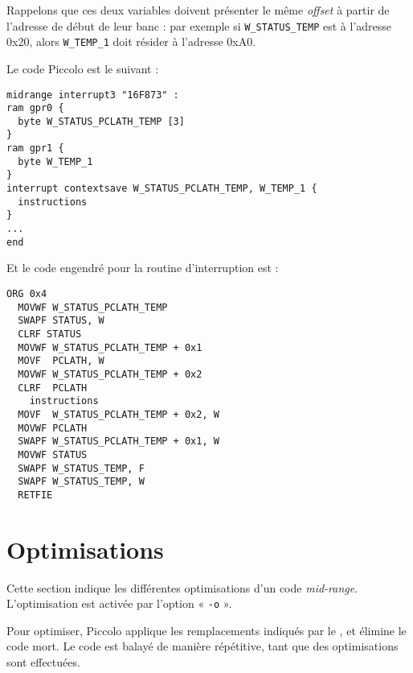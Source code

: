 Rappelons que ces deux variables doivent présenter le même \emph{offset} à partir de l'adresse de début de leur banc : par exemple si \texttt{W\_STATUS\_TEMP} est à l'adresse 0x20, alors \texttt{W\_TEMP\_1} doit résider à l'adresse 0xA0.

Le code Piccolo est le suivant :
\begin{lstlisting}[language=piccolo]
midrange interrupt3 "16F873" :
ram gpr0 {
  byte W_STATUS_PCLATH_TEMP [3]
}
ram gpr1 {
  byte W_TEMP_1
}
interrupt contextsave W_STATUS_PCLATH_TEMP, W_TEMP_1 {
  instructions
}
...
end
\end{lstlisting}

Et le code engendré pour la routine d'interruption est :
\begin{lstlisting}[language=assembleur]
  ORG 0x4
  MOVWF W_STATUS_PCLATH_TEMP
  SWAPF STATUS, W
  CLRF STATUS
  MOVWF W_STATUS_PCLATH_TEMP + 0x1
  MOVF  PCLATH, W
  MOVWF W_STATUS_PCLATH_TEMP + 0x2
  CLRF  PCLATH
    instructions
  MOVF  W_STATUS_PCLATH_TEMP + 0x2, W
  MOVWF PCLATH
  SWAPF W_STATUS_PCLATH_TEMP + 0x1, W
  MOVWF STATUS
  SWAPF W_STATUS_TEMP, F
  SWAPF W_STATUS_TEMP, W
  RETFIE
\end{lstlisting}









\section{Optimisations}

Cette section indique les différentes optimisations d'un code \emph{mid-range}. L'optimisation est activée par l'option « \texttt{-o} ».

Pour optimiser, Piccolo applique les remplacements indiqués par le , et élimine le code mort. Le code est balayé de manière répétitive, tant que des optimisations sont effectuées.


